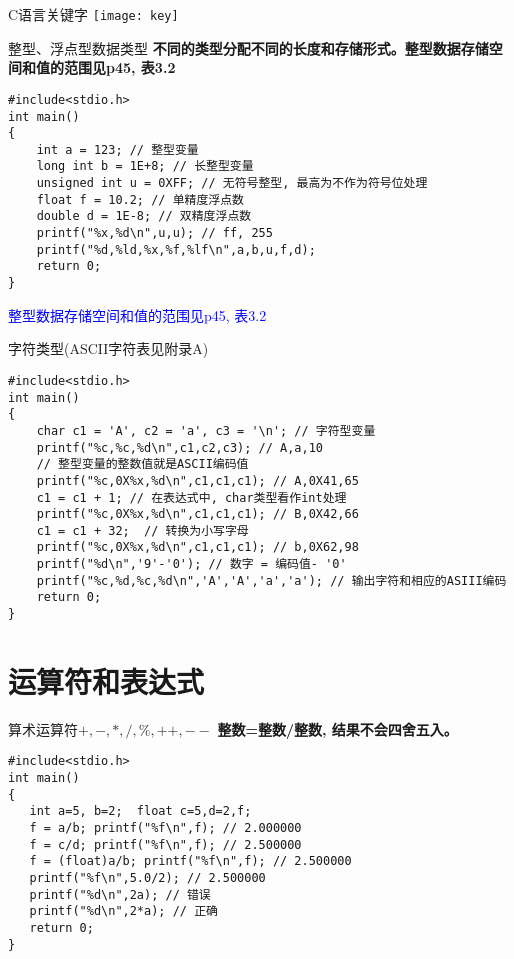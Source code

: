 \begin{frame}{C语言关键字}
\texttt{[image: key]}
\end{frame}

\begin{frame}[fragile]{整型、浮点型数据类型}
\textbf{不同的类型分配不同的长度和存储形式。整型数据存储空间和值的范围见p45, 表3.2}
\begin{lstlisting}
#include<stdio.h>           
int main()                   
{                            
    int a = 123; // 整型变量
    long int b = 1E+8; // 长整型变量
    unsigned int u = 0XFF; // 无符号整型, 最高为不作为符号位处理
    float f = 10.2; // 单精度浮点数
    double d = 1E-8; // 双精度浮点数
    printf("%x,%d\n",u,u); // ff, 255
    printf("%d,%ld,%x,%f,%lf\n",a,b,u,f,d);
    return 0;           
}                            
\end{lstlisting}
\textcolor{blue}{整型数据存储空间和值的范围见p45, 表3.2}
\end{frame}

\begin{frame}{字符类型(ASCII字符表见附录A)}
\begin{lstlisting}
#include<stdio.h>           
int main()                   
{                            
    char c1 = 'A', c2 = 'a', c3 = '\n'; // 字符型变量
    printf("%c,%c,%d\n",c1,c2,c3); // A,a,10
    // 整型变量的整数值就是ASCII编码值
    printf("%c,0X%x,%d\n",c1,c1,c1); // A,0X41,65
    c1 = c1 + 1; // 在表达式中, char类型看作int处理
    printf("%c,0X%x,%d\n",c1,c1,c1); // B,0X42,66
    c1 = c1 + 32;  // 转换为小写字母
    printf("%c,0X%x,%d\n",c1,c1,c1); // b,0X62,98
    printf("%d\n",'9'-'0'); // 数字 = 编码值- '0'
    printf("%c,%d,%c,%d\n",'A','A','a','a'); // 输出字符和相应的ASIII编码
    return 0;           
}                            
\end{lstlisting}
\end{frame}

\section{运算符和表达式}

\begin{frame}[fragile]{算术运算符$+, -, *, /, \%, ++, --$}
\textbf{整数=整数/整数, 结果不会四舍五入。}
\begin{lstlisting}
#include<stdio.h>           
int main()                   
{                            
   int a=5, b=2;  float c=5,d=2,f;
   f = a/b; printf("%f\n",f); // 2.000000
   f = c/d; printf("%f\n",f); // 2.500000
   f = (float)a/b; printf("%f\n",f); // 2.500000
   printf("%f\n",5.0/2); // 2.500000
   printf("%d\n",2a); // 错误
   printf("%d\n",2*a); // 正确
   return 0;           
}                            
\end{lstlisting}
\end{frame}

